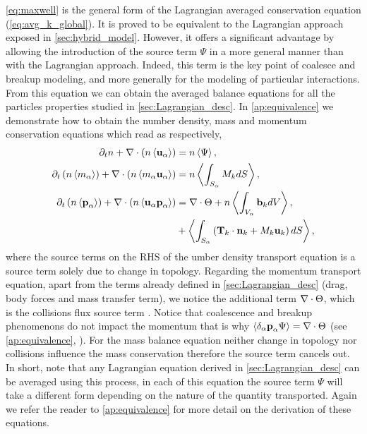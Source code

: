 \ref{eq:maxwell} is the general form of the Lagrangian averaged conservation equation (\ref{eq:avg_k_global}). 
It is proved to be equivalent to the Lagrangian approach exposed in \ref{sec:hybrid_model}. 
However, it offers a significant advantage by allowing the introduction of the source term $\Psi$ in a more general manner than with the Lagrangian approach.
Indeed, this term is the key point of coalesce and breakup modeling, and more generally for the modeling of particular interactions. 
From this equation we can obtain the averaged balance equations for all the particles properties studied in \ref{sec:Lagrangian_desc}.
In \ref{ap:equivalence} we demonstrate how to obtain the number density, mass and momentum conservation equations which read as respectively,
\begin{align*}
    \partial_t n
    + \mathbf{\nabla} \cdot \left(n \left<\textbf{u}_\alpha\right>\right)
    &= n\left<\Psi\right>,\\
    \partial_t \left(n\left<m_\alpha\right>\right)
    + \mathbf{\nabla} \cdot \left(n \left<m_\alpha \textbf{u}_\alpha\right>\right)
    &= n\left<\int_{S_\alpha} M_k dS\right>,\\
    \partial_t \left( n \left<\textbf{p}_\alpha\right>\right)
    + \mathbf{\nabla} \cdot \left(n \left<\textbf{u}_\alpha \textbf{p}_\alpha\right>\right)
    &=  \nabla \cdot \Theta
    + n\left<\int_{V_\alpha} \textbf{b}_k dV\right>,\\
    &+ \left<\int_{S_\alpha} \left(
    \textbf{T}_k\cdot\textbf{n}_k
    + M_k \textbf{u}_k
    \right)dS\right>,
\end{align*}
where the source terms on the RHS of the umber density transport equation is a source term solely due to change in topology.
Regarding the momentum transport equation, apart from the terms already defined in \ref{sec:Lagrangian_desc} (drag, body forces and mass transfer term), we notice the additional term $\mathbf{\nabla}\cdot\Theta$, which is the collisions flux source term \citep{curtiss1956kinetic}. 
Notice that coalescence and breakup phenomenons do not impact the momentum that is why $\left<\delta_\alpha \textbf{p}_\alpha \Psi\right> = \nabla\cdot\Theta$ (see \ref{ap:equivalence}, \citep{KAMP20011363}). 
For the mass balance equation neither change in topology nor collisions influence the mass conservation therefore the source term cancels out. 
In short, note that any Lagrangian equation derived in \ref{sec:Lagrangian_desc} can be averaged using this process, in each of this equation the source term $\Psi$ will take a different form depending on the nature of the quantity transported. 
Again we refer the reader to \ref{ap:equivalence} for more detail on the derivation of these equations. 



